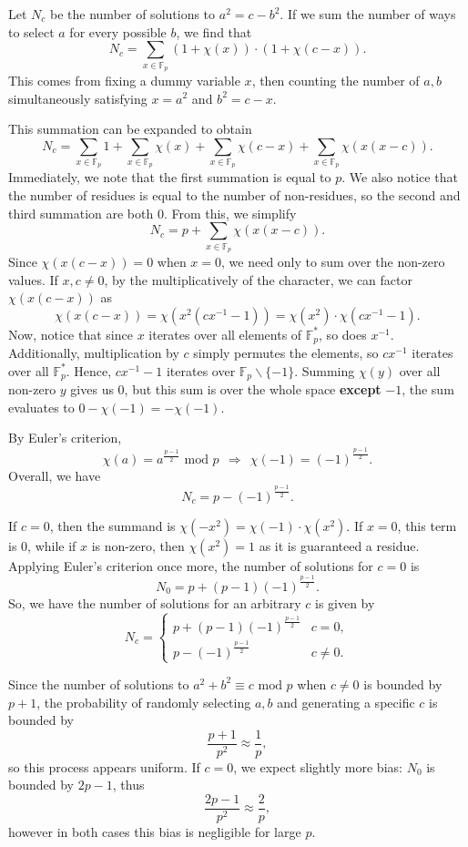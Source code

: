 \documentclass[12pt,titlepage,table]{article}
\begin{document}
\medskip
Let $N_c$ be the number of solutions to $a^2 = c - b^2$. If we sum the number of ways to select $a$ for every possible $b$, we find that
$$N_c = \sum_{x \in \mathbb{F}_p} (1 + \chi(x)) \cdot (1 + \chi(c - x)).$$
This comes from fixing a dummy variable $x$, then counting the number of $a,b$ simultaneously satisfying $x = a^2$ and $b^2 = c - x$.

\medskip
This summation can be expanded to obtain
$$N_c = \sum_{x \in \mathbb{F}_p} 1 + \sum_{x \in \mathbb{F}_p} \chi(x) + \sum_{x \in \mathbb{F}_p} \chi(c-x) + \sum_{x \in \mathbb{F}_p} \chi(x(x-c)).$$
Immediately, we note that the first summation is equal to $p$. We also notice that the number of residues is equal to the number of non-residues, so the second and third summation are both $0$. From this, we simplify
$$N_c = p + \sum_{x \in \mathbb{F}_p} \chi(x(x-c)).$$
Since $\chi(x(c-x)) = 0$ when $x = 0$, we need only to sum over the non-zero values. If $x,c \neq 0$, by the multiplicatively of the character, we can factor $\chi(x(c-x))$ as
$$\chi(x(c-x)) = \chi(x^2(cx^{-1} - 1)) = \chi(x^2) \cdot \chi(cx^{-1}-1).$$
Now, notice that since $x$ iterates over all elements of $\mathbb{F}_p^*$, so does $x^{-1}$. Additionally, multiplication by $c$ simply permutes the elements, so $cx^{-1}$ iterates over all $\mathbb{F}_p^*$. Hence, $cx^{-1}-1$ iterates over $\mathbb{F}_p \backslash \{-1\}$. Summing $\chi(y)$ over all non-zero $y$ gives us $0$, but this sum is over the whole space \textbf{except} $-1$, the sum evaluates to $0 - \chi(-1) = - \chi(-1)$.

\medskip
By Euler's criterion,
$$\chi(a) = a^{\frac{p-1}{2}} \text{ mod } p \ \ \Rightarrow \ \ \chi(-1) = (-1)^{\frac{p-1}{2}}.$$
Overall, we have
$$N_c = p - (-1)^{\frac{p-1}{2}}.$$

If $c = 0$, then the summand is $\chi(-x^2) = \chi(-1) \cdot \chi(x^2)$. If $x = 0$, this term is $0$, while if $x$ is non-zero, then $\chi(x^2) = 1$ as it is guaranteed a residue. 
Applying Euler's criterion once more, the number of solutions for $c = 0$ is
$$N_0 = p + (p-1)(-1)^{\frac{p-1}{2}}.$$
So, we have the number of solutions for an arbitrary $c$ is given by
$$N_c = \begin{cases}
    p + (p-1)(-1)^{\frac{p-1}{2}} & c = 0, \\
    p - (-1)^{\frac{p-1}{2}} & c \neq 0.
\end{cases}$$

\medskip
Since the number of solutions to $a^2 + b^2 \equiv c \text{ mod } p$ when $c \neq 0$ is bounded by $p+1$, the probability of randomly selecting $a,b$ and generating a specific $c$ is bounded by
$$\frac{p+1}{p^2} \approx \frac{1}{p},$$
so this process appears uniform. If $c = 0$, we expect slightly more bias: $N_0$ is bounded by $2p-1$, thus
$$\frac{2p-1}{p^2} \approx \frac{2}{p},$$
however in both cases this bias is negligible for large $p$.
\end{document}
